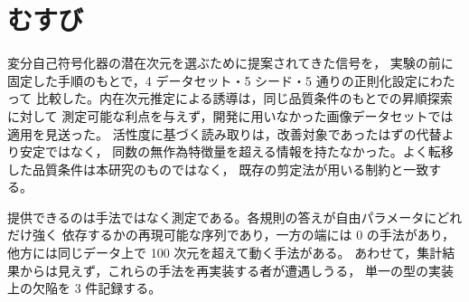 \documentclass[11pt,a4paper]{jsarticle}
\begin{document}
\section{むすび}\label{sec:conclusion}

変分自己符号化器の潜在次元を選ぶために提案されてきた信号を，
実験の前に固定した手順のもとで，4 データセット・5 シード・5 通りの正則化設定にわたって
比較した。内在次元推定による誘導は，同じ品質条件のもとでの昇順探索に対して
測定可能な利点を与えず，開発に用いなかった画像データセットでは適用を見送った。
活性度に基づく読み取りは，改善対象であったはずの代替より安定ではなく，
同数の無作為特徴量を超える情報を持たなかった。よく転移した品質条件は本研究のものではなく，
既存の剪定法が用いる制約と一致する。

提供できるのは手法ではなく測定である。各規則の答えが自由パラメータにどれだけ強く
依存するかの再現可能な序列であり，一方の端には 0 の手法があり，
他方には同じデータ上で 100 次元を超えて動く手法がある。
あわせて，集計結果からは見えず，これらの手法を再実装する者が遭遇しうる，
単一の型の実装上の欠陥を 3 件記録する。
\end{document}
